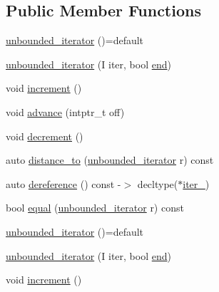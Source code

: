 \subsection*{Public Member Functions}
\begin{DoxyCompactItemize}
\item 
\mbox{\hyperlink{structrah_1_1view_1_1unbounded__iterator_aecc43db612ed5ad8e6002356feb92b48}{unbounded\+\_\+iterator}} ()=default
\item 
\mbox{\hyperlink{structrah_1_1view_1_1unbounded__iterator_a6043d431a0b2db6691397dd8029287b4}{unbounded\+\_\+iterator}} (I iter, bool \mbox{\hyperlink{namespacerah_a20a3e45aee90bb5534a00c6b14e06069}{end}})
\item 
void \mbox{\hyperlink{structrah_1_1view_1_1unbounded__iterator_a903c96112b62831505ba8c7af80f6263}{increment}} ()
\item 
void \mbox{\hyperlink{structrah_1_1view_1_1unbounded__iterator_ac5605e2d9558a9569c0e24dcf7a78c10}{advance}} (intptr\+\_\+t off)
\item 
void \mbox{\hyperlink{structrah_1_1view_1_1unbounded__iterator_ab3f812c596c17777717ff92aad65e295}{decrement}} ()
\item 
auto \mbox{\hyperlink{structrah_1_1view_1_1unbounded__iterator_a3f5ca68b137f2fb1175a100a0839a71a}{distance\+\_\+to}} (\mbox{\hyperlink{structrah_1_1view_1_1unbounded__iterator}{unbounded\+\_\+iterator}} r) const
\item 
auto \mbox{\hyperlink{structrah_1_1view_1_1unbounded__iterator_a99189d6052f625642f8e00ff6e58a860}{dereference}} () const -\/$>$ decltype($\ast$\mbox{\hyperlink{structrah_1_1view_1_1unbounded__iterator_a50affaae71d4122b92014b11763f6672}{iter\+\_\+}})
\item 
bool \mbox{\hyperlink{structrah_1_1view_1_1unbounded__iterator_ae9234860041ae72e3b2667d8121fa224}{equal}} (\mbox{\hyperlink{structrah_1_1view_1_1unbounded__iterator}{unbounded\+\_\+iterator}} r) const
\item 
\mbox{\hyperlink{structrah_1_1view_1_1unbounded__iterator_aecc43db612ed5ad8e6002356feb92b48}{unbounded\+\_\+iterator}} ()=default
\item 
\mbox{\hyperlink{structrah_1_1view_1_1unbounded__iterator_a6043d431a0b2db6691397dd8029287b4}{unbounded\+\_\+iterator}} (I iter, bool \mbox{\hyperlink{namespacerah_a20a3e45aee90bb5534a00c6b14e06069}{end}})
\item 
void \mbox{\hyperlink{structrah_1_1view_1_1unbounded__iterator_a903c96112b62831505ba8c7af80f6263}{increment}} ()
\item 

\end{DoxyCompactItemize}
